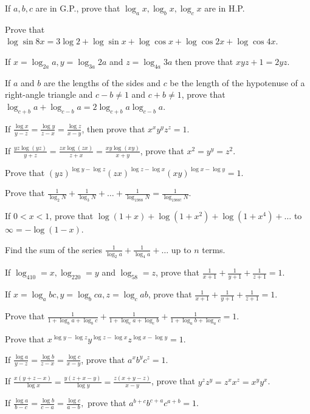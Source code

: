 \item If $a, b, c$ are in G.P., prove that $\log_ax, \log_bx, \log_cx$ are in H.P.
\item Prove that $\log\sin8x = 3\log2 + \log\sin x + \log\cos x + \log\cos2x + \log\cos4x$.
\item If $x = \log_{2a}a, y = \log_{3a}2a$ and $z = \log_{4a}3a$ then prove that $xyz + 1 = 2yz$.
\item If $a$ and $b$ are the lengths of the sides and $c$ be the length of the hypotenuse of a right-angle triangle and $c - b \neq
  1$ and $c + b\neq 1$, prove that $\log_{c + b}a + \log_{c - b}a = 2\log_{c + b}a\log_{c - b}a$.
\item If $\frac{\log x}{y - z} = \frac{\log y}{z - x} = \frac{\log z}{x - y}$, then prove that $x^xy^yz^z = 1$.
\item If $\frac{yz\log(yz)}{y + z} = \frac{zx\log(zx)}{z + x} = \frac{xy\log(xy)}{x + y}$, prove that $x^2 = y^y = z^2$.
\item Prove that $(yz)^{\log y - \log z}(zx)^{\log z - \log x}(xy)^{\log x - \log y} = 1$.
\item Prove that $\frac{1}{\log_2N} + \frac{1}{\log_3N} + \ldots + \frac{1}{\log_{1988}N} = \frac{1}{\log_{1988!}N}$.
\item If $0<x<1$, prove that $\log(1 + x) + \log(1 + x^2) + \log(1 + x^4) + \ldots$ to $\infty = -\log(1 - x)$.
\item Find the sum of the series $\frac{1}{\log_2a} + \frac{1}{\log_4a} + \ldots$ up to $n$ terms.
\item If $\log_410 = x, \log_220 = y$ and $\log_58 = z$, prove that $\frac{1}{x + 1} + \frac{1}{y + 1} + \frac{1}{z + 1} = 1$.
\item If $x = \log_abc, y = \log_bca, z = \log_cab$, prove that $\frac{1}{x + 1} + \frac{1}{y + 1} + \frac{1}{z + 1} = 1$.
\item Prove that $\frac{1}{1 + \log_ba + \log_bc} + \frac{1}{1 + \log_ca + \log_cb} + \frac{1}{1 + \log_ab + \log_ac} = 1$.
\item Prove that $x^{\log y - \log z}y^{\log z - \log x}z^{\log x - \log y} = 1$.
\item If $\frac{\log a}{y - z} = \frac{\log b}{z - x} = \frac{\log c}{x - y}$, prove that $a^xb^yc^z = 1$.
\item If $\frac{x(y + z - x)}{\log x} = \frac{y(z + x - y)}{\log y} = \frac{z(x + y - z)}{x - y}$, prove that $y^zz^y = z^xx^z =
  x^yy^x$.
\item If $\frac{\log a}{b - c} = \frac{\log b}{c - a} = \frac{\log c}{a - b},$ prove that $a^{b + c}b^{c + a}c^{a + b} = 1$.
